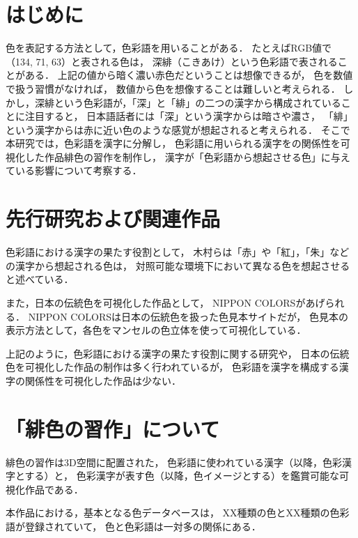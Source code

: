 \documentclass[a4j,twocolumn]{ujarticle} %
\newcommand{\workname}{緋色の習作}
\newcommand{\colorname}{色彩語}
\newcommand{\colorkanji}{色彩漢字}
\newcommand{\recallcolor}{色イメージ}
\begin{document}
\maketitle
\thispagestyle{myheadings}

\section{はじめに}

色を表記する方法として，\colorname{}を用いることがある．
たとえばRGB値で（134, 71, 63）と表される色は，
深緋（こきあけ）という\colorname{}で表されることがある．
上記の値から暗く濃い赤色だということは想像できるが，
色を数値で扱う習慣がなければ，
数値から色を想像することは難しいと考えられる．
しかし，深緋という\colorname{}が，「深」と「緋」の二つの漢字から構成されていることに注目すると，
日本語話者には「深」という漢字からは暗さや濃さ，
「緋」という漢字からは赤に近い色のような感覚が想起されると考えられる．
そこで本研究では，\colorname{}を漢字に分解し，
\colorname{}に用いられる漢字をの関係性を可視化した作品\workname{}を制作し，
漢字が「\colorname{}から想起させる色」に与えている影響について考察する．

\section{先行研究および関連作品}

色彩語における漢字の果たす役割として，
木村ら\cite{Kimura1998}は「赤」や「紅」，「朱」などの漢字から想起される色は，
対照可能な環境下において異なる色を想起させると述べている．

また，日本の伝統色を可視化した作品として，
NIPPON COLORS\cite{NipponColors}があげられる．
NIPPON COLORSは日本の伝統色を扱った色見本サイトだが，
色見本の表示方法として，各色をマンセルの色立体を使って可視化している．

上記のように，色彩語における漢字の果たす役割に関する研究や，
日本の伝統色を可視化した作品の制作は多く行われているが，
色彩語を漢字を構成する漢字の関係性を可視化した作品は少ない．

\section{「\workname{}」について}

\workname{}は3D空間に配置された，
\colorname{}に使われている漢字（以降，\colorkanji{}とする）と，
\colorkanji{}が表す色（以降，\recallcolor{}とする）を鑑賞可能な可視化作品である．

本作品における，基本となる色データベースは，
XX種類の色とXX種類の\colorname{}が登録されていて，
色と\colorname{}は一対多の関係にある．
\end{document}
